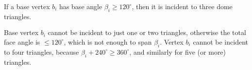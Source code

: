 \documentclass[10pt,a4paper]{amsart}
\def\b{{\beta}}
\newcommand{\lemlab}[1]{\label{lemma:#1}}
\newenvironment{proof}{{\bf Proof:}}{\hfill\ABox\medskip}
\begin{document}
\begin{lemma}
\lemlab{3Triangles}
\label{lem:3Triangles}
If a 
base vertex  $b_i$ has base angle 
$\b_i \ge 120^\circ$,
then it is incident to three dome triangles. %
\end{lemma}

\begin{proof}
Base vertex $b_i$ cannot 
be incident to just one
or two triangles, otherwise the total face angle is $\le 120^\circ$, which
is not enough to span $\b_i$.
Vertex $b_i$ cannot
be incident to four triangles,
because 
$\b_i + 240^\circ \ge 360^\circ$,
and similarly for 
five (or more) triangles.
%
\end{proof}
\end{document}
